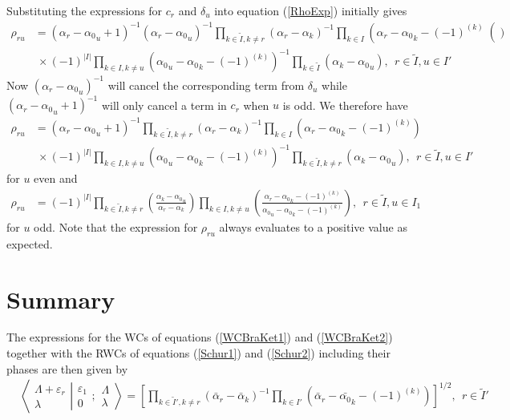\documentclass[12pt]{article}
\begin{document}
Substituting the expressions for ${c}_r$ and ${\delta}_u$ into equation 
 (\ref{RhoExp}) initially gives
\begin{align*}
{\rho}_{ru} &= ({\alpha}_r-{\alpha_0}_u + 1)^{-1}({\alpha}_r-{\alpha_0}_u)^{-1} \prod_{k\in \tilde{I},k\neq r} \left(\alpha_r - \alpha_k \right)^{-1}\prod_{k\in
I} \left(\alpha_r - {\alpha_0}_k - (-1)^{(k)}\right() \\
& ~\times (-1)^{|I|} \prod_{k\in I,k\neq u} \left({\alpha_0}_u - {\alpha_0}_k -
(-1)^{(k)}\right)^{-1}\prod_{k\in\tilde{I}} \left(\alpha_k - {\alpha_0}_u \right),\ \ r\in \tilde{I},u\in I' 
\end{align*}
Now $({\alpha}_r-{\alpha_0}_u)^{-1}$ will cancel the corresponding term from $\delta_u$ while $
({\alpha}_r-{\alpha_0}_u + 1)^{-1}$ will only cancel a term in $c_r$ when $u$ is odd. We therefore have
\begin{align*}
{\rho}_{ru} &= ({\alpha}_r-{\alpha_0}_u + 1)^{-1}\prod_{k\in \tilde{I},k\neq r} \left(\alpha_r - \alpha_k \right)^{-1}\prod_{k\in
I} \left(\alpha_r - {\alpha_0}_k - (-1)^{(k)}\right) \\
& ~\times (-1)^{|I|} \prod_{k\in I,k\neq u} \left({\alpha_0}_u - {\alpha_0}_k -
(-1)^{(k)}\right)^{-1}\prod_{k\in\tilde{I},k \neq r} \left(\alpha_k - {\alpha_0}_u \right),\ \ r\in \tilde{I},u\in I' 
\end{align*}
for $u$ even and
\begin{align*}
{\rho}_{ru} &= (-1)^{|I|} \prod_{k\in \tilde{I},k\neq r} 
\left(
\frac 
{\alpha_k - {\alpha_0}_u  }
{\alpha_r - \alpha_k }
\right)
\prod_{k\in I,k \neq u} 
\left(
\frac
{ \alpha_r - {\alpha_0}_k - (-1)^{(k)} }
{{\alpha_0}_u - {\alpha_0}_k - (-1)^{(k)} }
\right)
,\ \ r\in \tilde{I},u\in I_1
\end{align*}
for $u$ odd.
Note that the expression for $\rho_{ru}$ always evaluates to a positive value as expected.

\section{Summary}
The expressions for the WCs of equations (\ref{WCBraKet1}) and (\ref{WCBraKet2}) together with the RWCs of equations (\ref{Schur1}) and (\ref{Schur2}) including their phases \cite{GIW2,GIW3} are then given by
\begin{align}
& \left\langle\left. 
\begin{array}{c} \Lambda+\varepsilon_r\\ \lambda
 \end{array}
\right|\right.
\left.
\begin{array}{c} \varepsilon_1 \\ 0 
 \end{array}
; \begin{array}{c} \Lambda \\ \lambda
 \end{array}
\right\rangle = \left[ \prod_{k\in \tilde{I}',k\neq r} \left(\bar{\alpha}_r - \bar{\alpha}_k\right)^{-1}\prod_{k\in
I'} \left(\bar{\alpha}_r - \bar{\alpha_0}_k - (-1)^{(k)}\right) \right]^{1/2}
,\ \ r\in \tilde{I}'
\end{align}
\end{document}
